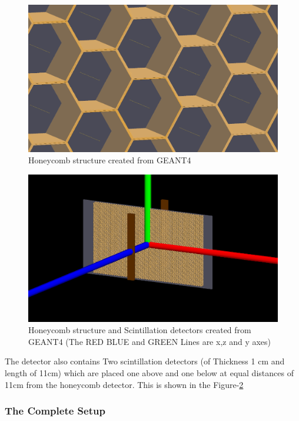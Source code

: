 \documentclass{article}
\begin{document}
\begin{multicols}{2}
\begin{figure}[H]
    \centering	
     \includegraphics[width=\columnwidth]{honeycomb.png}
     \caption{Honeycomb structure created from GEANT4}
     \label{honeycomb}
\end{figure}

\begin{figure}[H]
    \centering	
     \includegraphics[width=\columnwidth]{honeycomb1.png}
     \caption{Honeycomb structure and Scintillation detectors created from GEANT4 (The RED BLUE and GREEN Lines are x,z and y axes)}
     \label{honeycomb1}
\end{figure}
The detector also contains Two scintillation detectors (of Thickness 1 cm and length of 11cm)  which are placed one above and one below at equal distances of 11cm
from the honeycomb detector. This is shown in the Figure-\ref{honeycomb1}







\subsubsection{The Complete Setup}


\end{multicols}
\end{document}
